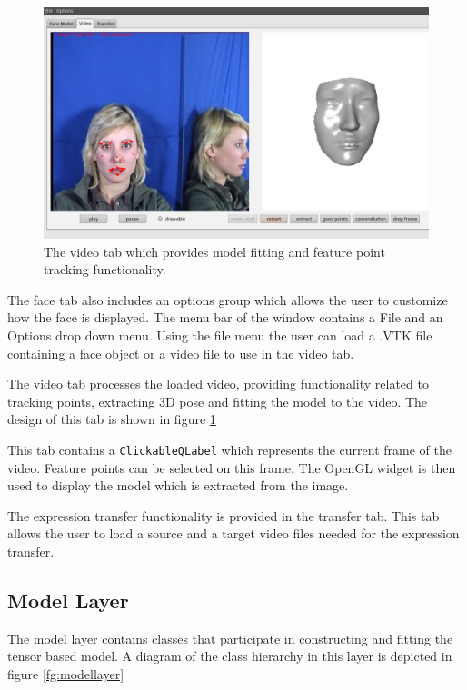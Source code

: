 \documentclass[11pt,a4paper]{report}
\begin{document}
\begin{figure}[H]
\begin{centering}
\includegraphics[scale=0.35]{images/videotab.png}
\par\end{centering}

\caption{The video tab which provides model fitting and feature point tracking functionality.}
\label{fg:videotab}
\end{figure}

The face tab also includes an options group which allows the user to customize how
the face is displayed. The menu bar of the window contains a File and an
Options drop down menu. Using the file menu the user can load a .VTK file
containing a face object or a video file to use in the video tab.

The video tab processes the loaded video, providing functionality related to tracking points, extracting 3D
pose and fitting the model to the video. The design of this tab is shown in
figure \ref{fg:videotab} 


This tab contains a \texttt{ClickableQLabel} which represents the current frame
of the video. Feature points can be selected on this frame. The 
OpenGL widget is then used to display the model which is extracted from the image.

The expression transfer functionality is provided in the transfer tab. This tab allows the user to load a
source and a target video files needed for the expression transfer.

\subsection{Model Layer}
The model layer contains classes that participate in constructing and fitting
the tensor based model. A diagram of the class hierarchy in this layer is
depicted in figure \ref{fg:modellayer}
\end{document}

